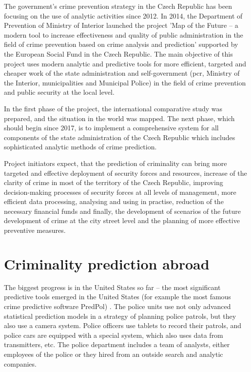 \documentclass[thesis=M,english]{FITthesis}[2012/10/20]
\begin{document}
The government's crime prevention strategy in the Czech Republic has been focusing on the use of analytic activities since 2012. In 2014, the Department of Prevention of Ministry of Interior launched the project 'Map of the Future -- a modern tool to increase effectiveness and quality of public administration in the field of crime prevention based on crime analysis and prediction' supported by the European Social Fund in the Czech Republic.\cite{futuremaps} The main objective of this project uses modern analytic and predictive tools for more efficient, targeted and cheaper work of the state administration and self-government (\gls{pcr}, Ministry of the Interior, municipalities and Municipal Police) in the field of crime prevention and public security at the local level.

In the first phase of the project, the international comparative study was prepared, and the situation in the world was mapped. The next phase, which should begin since 2017, is to implement a comprehensive system for all components of the state administration of the Czech Republic which includes sophisticated analytic methods of crime prediction. 

Project initiators expect, that the prediction of criminality can bring more targeted and effective deployment of security forces and resources, increase of the clarity of crime in most of the territory of the Czech Republic, improving decision-making processes of security forces at all levels of management, more efficient data processing, analysing and using in practise, reduction of the necessary financial funds and finally, the development of scenarios of the future development of crime at the city street level and the planning of more effective preventive measures. 

\section{Criminality prediction abroad}

The biggest progress is in the United States so far -- the most significant predictive tools emerged in the United States (for example the most famous crime predictive software PredPol) \cite[285]{Hruska2015maps}. The police units use not only advanced statistical prediction models in a strategy of planning police patrols, but they also use a camera system. Police officers use tablets to record their patrols, and police cars are equipped with a special system, which also uses data from transmitters, etc. The police department includes a team of analysts, either employees of the police or they hired from an outside search and analytic companies.
\end{document}
